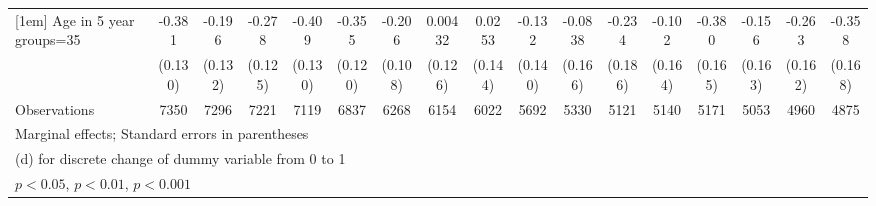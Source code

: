 {\begin{tabular}{l*{16}{c}}
[1em]
Age in 5 year groups=35&      -0.381\sym{**} &      -0.196         &      -0.278\sym{*}  &      -0.409\sym{**} &      -0.355\sym{**} &      -0.206         &     0.00432         &      0.0253         &      -0.132         &     -0.0838         &      -0.234         &      -0.102         &      -0.380\sym{*}  &      -0.156         &      -0.263         &      -0.358\sym{*}  \\
                    &     (0.130)         &     (0.132)         &     (0.125)         &     (0.130)         &     (0.120)         &     (0.108)         &     (0.126)         &     (0.144)         &     (0.140)         &     (0.166)         &     (0.186)         &     (0.164)         &     (0.165)         &     (0.163)         &     (0.162)         &     (0.168)         \\
\hline
Observations        &        7350         &        7296         &        7221         &        7119         &        6837         &        6268         &        6154         &        6022         &        5692         &        5330         &        5121         &        5140         &        5171         &        5053         &        4960         &        4875         \\
\hline\hline
\multicolumn{17}{l}{\footnotesize Marginal effects; Standard errors in parentheses}\\
\multicolumn{17}{l}{\footnotesize  (d) for discrete change of dummy variable from 0 to 1}\\
\multicolumn{17}{l}{\footnotesize \sym{*} \(p<0.05\), \sym{**} \(p<0.01\), \sym{***} \(p<0.001\)}\\
\end{tabular}
}
